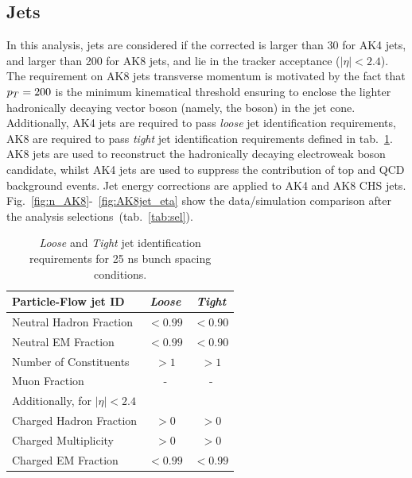\subsection{Jets}\label{ssec:jets}
In this analysis, jets are considered if the corrected \pt is larger than 30 \GeV for AK4 jets, and larger than 200 \GeV for AK8 jets, and lie in the tracker acceptance ($|\eta|<2.4$). The requirement on AK8 jets transverse momentum is motivated by the fact that $p_T = 200$ \GeV is the minimum kinematical threshold ensuring to enclose the lighter hadronically decaying vector boson (namely, the \W boson) in the jet cone. Additionally, AK4 jets are required to pass \emph{loose} jet identification requirements, AK8 are required to pass \emph{tight} jet identification requirements defined in tab.~\ref{tab:JetId}. AK8 jets are used to reconstruct the hadronically decaying electroweak boson candidate, whilst AK4 jets are used to suppress the contribution of top and QCD background events. Jet energy corrections are applied to AK4 and AK8 CHS jets. Fig.~\ref{fig:n_AK8}-~\ref{fig:AK8jet_eta} show the data/simulation comparison after the analysis selections~(tab.~\ref{tab:sel}).

\begin{table}[htb]
 \centering
 \caption{ \emph{Loose} and \emph{Tight} jet identification requirements for 25 ns bunch spacing conditions.\label{tab:JetId}}
 \begin{tabular}{l|cc}
Particle-Flow jet ID                       & \emph{Loose}   & \emph{Tight}   \\
\hline
 \hline
Neutral Hadron Fraction         & $< 0.99  $     & $< 0.90  $    \\
Neutral EM Fraction             & $< 0.99  $     & $< 0.90  $\\
Number of Constituents          & $> 1     $     & $> 1     $\\
Muon Fraction                   & \--            & \-- \\
\hline
\multicolumn{3}{l}{Additionally, for $|\eta| < 2.4$ } \\
\hline
Charged Hadron Fraction         & $> 0   $& $> 0   $\\
Charged Multiplicity            & $> 0   $& $> 0   $\\
Charged EM Fraction             & $< 0.99$& $< 0.99$\\
 \end{tabular}

\end{table}

